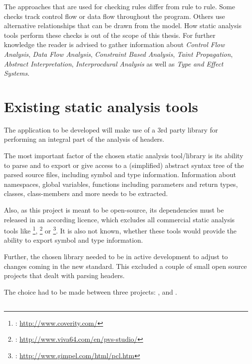 The approaches that are used for checking rules differ from rule to rule. Some checks track control flow or data flow throughout the program. Others use alternative relationships that can be drawn from the model. How static analysis tools perform these checks is out of the scope of this thesis. For further knowledge the reader is advised to gather information about \textit{Control Flow Analysis}, \textit{Data Flow Analysis}, \textit{Constraint Based Analysis}, \textit{Taint Propagation}, \textit{Abstract Interpretation}, \textit{Interprocdural Analysis }as well as \textit{Type and Effect Systems}. 

\section{Existing static analysis tools}

The application to be developed will make use of a 3rd party library for performing an integral part of the analysis of  headers. 

The most important factor of the chosen static analysis tool/library is its ability to parse  and to export or give access to a (simplified) abstract syntax tree of the parsed source files, including symbol and type information. Information about namespaces, global variables, functions including parameters and return types, classes, class-members and more needs to be extracted.

Also, as this project is meant to be open-source, its dependencies must be released in an according licence, which excludes all commercial static analysis tools like \footnote{: \url{http://www.coverity.com/}}, \footnote{: \url{http://www.viva64.com/en/pvs-studio/}} or \footnote{: \url{http://www.gimpel.com/html/pcl.htm}}. It is also not known, whether these tools would provide the ability to export symbol and type information.

Further, the chosen library needed to be in active development to adjust to changes coming in the new  standard. This excluded a couple of small open source projects that dealt with parsing  headers.

The choice had to be made between three projects: ,  and .

\subsection{}

